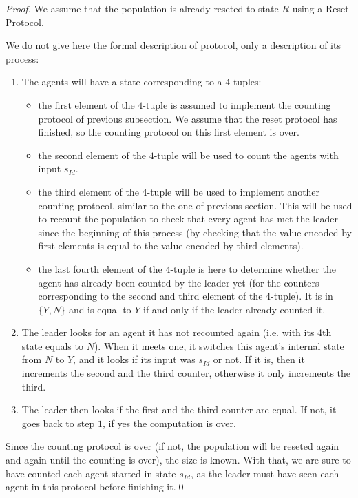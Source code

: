 \documentclass[UKenglish]{llncs}
\begin{document}
\begin{proof}
We assume that the population is already reseted to state $R$ using a Reset Protocol.

We do not give here the formal description of protocol, only a description of its process:
\begin{enumerate}
\item[0.] The agents will have a state corresponding to a $4$-tuples:
  \begin{itemize}
  \item the first element of the $4$-tuple is assumed to implement the
    counting protocol of previous subsection. We assume that the reset
    protocol has finished, so the counting protocol on this
first element is over.
\item the second element of the $4$-tuple will be used to count the agents
  with input $s_{Id}$.
\item the third element of the $4$-tuple will be used to implement another counting protocol, similar to the one of previous section. This will be used to recount the population to check that
    every agent has met the leader since the beginning of this process
    (by checking that the value encoded by first elements is equal to
    the value encoded by third elements).
\item the last fourth element of the $4$-tuple is
    here to determine whether the agent has already been  counted by the leader
    yet (for the counters corresponding to the second and third
    element of the 4-tuple).  It  is in
    $\{Y,N\}$ and is equal to $Y$ if and only if the leader already
    counted it.
  \end{itemize}


\item The leader looks for an agent it has not recounted again (i.e. with its 4th state equals to $N$).
When it meets one, it switches this agent's internal state from $N$ to $Y$, and it looks if its input was $s_{Id}$ or not. If it is, then it increments the second and the third counter,
otherwise it only increments  the third.
\item The leader then looks if the first and the third counter are equal. If not, it goes back to 
step $1$, if yes the computation is over.
\end{enumerate}

Since the counting protocol is over (if not, the population will be reseted again and again
until the counting is over), the size is known. With that, we are sure to have counted each agent
started in state $s_{Id}$, as the leader must have seen each agent in this protocol before
finishing it.\hfill \qed

\end{proof}
\end{document}
